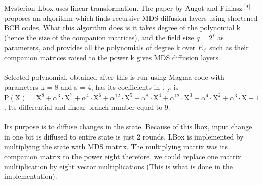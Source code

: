 \documentclass[preprint]{transcrypto}
\begin{document}
Mysterion Lbox uses linear transformation. The paper by Augot and Finiasz$^{[9]}$ proposes an algorithm which finds recursive MDS diffusion layers using shortened BCH codes. What this algorithm does is it takes degree of the polynomial k (hence the size of the companion matrices), and the field size $q = 2^s$ as parameters, and provides all the polynomials of degree k over $F_{2^s}$ such as their companion matrices raised to the power k gives MDS diffusion layers. \\ \\
Selected polynomial, obtained after this is run using Magma code with parameters k = 8 and s = 4, has its coefficients in $\mathbb{F}_{2^{4}}$ is $\mathrm{P}(\mathrm{X})=\mathrm{X}^{8}+\alpha^{3} \cdot \mathrm{X}^{7}+\alpha^{4} \cdot \mathrm{X}^{6}+\alpha^{12} \cdot \mathrm{X}^{5}+\alpha^{8} \cdot \mathrm{X}^{4}+\alpha^{12} \cdot \mathrm{X}^{3}+\alpha^{4} \cdot \mathrm{X}^{2}+\alpha^{3} \cdot \mathrm{X}+1$.
Its differential and linear branch number equal to 9. 
\\ \\
Its purpose is to diffuse changes in the state. Because of this lbox, input change in one bit is diffused to entire state is just 2 rounds. LBox is implemented by multiplying the state with MDS matrix. The multiplying matrix was its companion matrix to the power eight therefore, we could replace one matrix multiplication by eight vector multiplications (This is what is done in the implementation). \\
\end{document}
